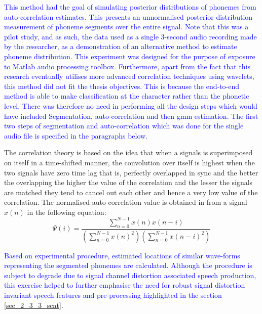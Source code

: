 \textcolor{blue}{This method had the goal of simulating posterior distributions of phonemes from auto-correlation estimates.  This presents an unnormalised posterior distribution measurement of phoneme segments over the entire signal.  Note that this was a pilot study, and as such, the data used as a single 3-second audio recording made by the researcher, as a demonstration of an alternative method to estimate phoneme distribution.  This experiment was designed for the purpose of exposure to Matlab audio processing toolbox. Furthermore, apart from the fact that this research eventually utilises more advanced correlation techniques using wavelets, this method did not fit the thesis objectives. This is because the end-to-end method is able to make classification at the character rather than the phonetic level.  There was therefore no need in performing all the design steps which would have included Segmentation, auto-correlation and then \acrfull{gmm} estimation.  The first two steps of segmentation and auto-correlation which was done for the single audio file is specified in the paragraphs below.}

The correlation theory is based on the idea that when a signals is superimposed on itself in a time-shifted manner, the convolution over itself is highest when the two signals have zero time lag that is, perfectly overlapped in sync and the better the overlapping the higher the value of the correlation and the lesser the signals are matched they tend to cancel out each other and hence a very low value of the correlation.  The normalised auto-correlation value is obtained in \cite{picone1996fundamentals} from a signal $x(n)$ in the following equation:
\begin{equation}
    \Psi(i)=\frac{\sum_{n=0}^{N-1}x(n)x(n-i)}{\left(\sum_{n=0}^{N-1}x(n)^2\right)\left(\sum_{n=0}^{N-1}x(n-i)^2\right)}\label{c3eq_corr}
\end{equation}

\textcolor{blue}{Based on experimental procedure, estimated locations of similar wave-forms representing the segmented phonemes are calculated.  Although the procedure is subject to degrade due to signal channel distortion associated speech production, this exercise helped to further emphasise the need for robust signal distortion invariant speech features and pre-processing highlighted in the section \ref{sec_2_3_3_scat}.}

